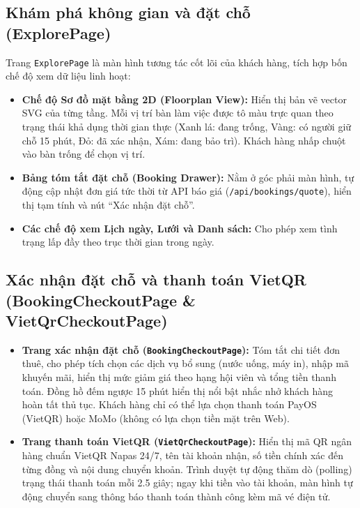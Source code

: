 \subsection{Khám phá không gian và đặt chỗ (ExplorePage)}
\label{ssec:gd_explore}
Trang \texttt{ExplorePage} là màn hình tương tác cốt lõi của khách hàng, tích hợp bốn chế độ xem dữ liệu linh hoạt:
\begin{itemize}
    \item \textbf{Chế độ Sơ đồ mặt bằng 2D (Floorplan View):} Hiển thị bản vẽ vector SVG của từng tầng. Mỗi vị trí bàn làm việc được tô màu trực quan theo trạng thái khả dụng thời gian thực (Xanh lá: đang trống, Vàng: có người giữ chỗ 15 phút, Đỏ: đã xác nhận, Xám: đang bảo trì). Khách hàng nhấp chuột vào bàn trống để chọn vị trí.
    \item \textbf{Bảng tóm tắt đặt chỗ (Booking Drawer):} Nằm ở góc phải màn hình, tự động cập nhật đơn giá tức thời từ API báo giá (\texttt{/api/bookings/quote}), hiển thị tạm tính và nút ``Xác nhận đặt chỗ''.
    \item \textbf{Các chế độ xem Lịch ngày, Lưới và Danh sách:} Cho phép xem tình trạng lấp đầy theo trục thời gian trong ngày.
\end{itemize}


\subsection{Xác nhận đặt chỗ và thanh toán VietQR (BookingCheckoutPage \& VietQrCheckoutPage)}
\begin{itemize}
    \item \textbf{Trang xác nhận đặt chỗ (\texttt{BookingCheckoutPage}):} Tóm tắt chi tiết đơn thuê, cho phép tích chọn các dịch vụ bổ sung (nước uống, máy in), nhập mã khuyến mãi, hiển thị mức giảm giá theo hạng hội viên và tổng tiền thanh toán. Đồng hồ đếm ngược 15 phút hiển thị nổi bật nhắc nhở khách hàng hoàn tất thủ tục. Khách hàng chỉ có thể lựa chọn thanh toán PayOS (VietQR) hoặc MoMo (không có lựa chọn tiền mặt trên Web).
    \item \textbf{Trang thanh toán VietQR (\texttt{VietQrCheckoutPage}):} Hiển thị mã QR ngân hàng chuẩn VietQR Napas 24/7, tên tài khoản nhận, số tiền chính xác đến từng đồng và nội dung chuyển khoản. Trình duyệt tự động thăm dò (polling) trạng thái thanh toán mỗi 2.5 giây; ngay khi tiền vào tài khoản, màn hình tự động chuyển sang thông báo thanh toán thành công kèm mã vé điện tử.
\end{itemize}

